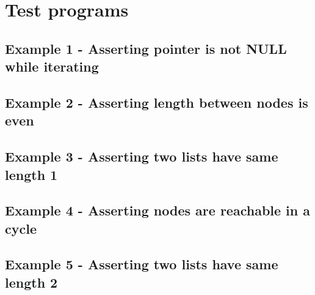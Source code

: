 \newpage
\clearpage
\section*{Test programs}
\subsection*{Example 1 - Asserting pointer is not NULL while iterating}
\newpage
\clearpage
\subsection*{Example 2 - Asserting length between nodes is even}
\newpage
\clearpage
\subsection*{Example 3 - Asserting two lists have same length 1}
\newpage
\clearpage
\subsection*{Example 4 - Asserting nodes are reachable in a cycle}
\newpage
\clearpage
\subsection*{Example 5 - Asserting two lists have same length 2}
